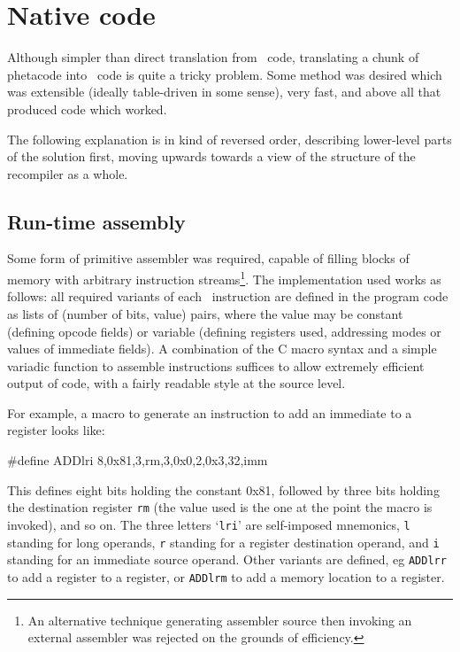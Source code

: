 \section{Native code}

Although simpler than direct translation from \arm\ code, translating a chunk of phetacode into \ia\ code is quite a tricky problem. Some method was desired which was extensible (ideally table-driven in some sense), very fast, and above all that produced code which worked.

The following explanation is in kind of reversed order, describing lower-level parts of the solution first, moving upwards towards a view of the structure of the recompiler as a whole.

\subsection{Run-time assembly}

Some form of primitive assembler was required, capable of filling blocks of memory with arbitrary instruction streams\footnote{An alternative technique generating assembler source then invoking an external assembler was rejected on the grounds of efficiency.}. The implementation used works as follows: all required variants of each \ia\ instruction are defined in the program code as lists of (number of bits, value) pairs, where the value may be constant (defining opcode fields) or variable (defining registers used, addressing modes or values of immediate fields). A combination of the C macro syntax and a simple variadic function to assemble instructions suffices to allow extremely efficient output of code, with a fairly readable style at the source level.

For example, a macro to generate an instruction to add an immediate to a register looks like:

\begin{code}
\#define ADDlri 8,0x81,3,rm,3,0x0,2,0x3,32,imm
\end{code}

This defines eight bits holding the constant 0x81, followed by three bits holding the destination register {\tt rm} (the value used is the one at the point the macro is invoked), and so on. The three letters `{\tt lri}' are self-imposed mnemonics, {\tt l} standing for long operands, {\tt r} standing for a register destination operand, and {\tt i} standing for an immediate source operand. Other variants are defined, eg {\tt ADDlrr} to add a register to a register, or {\tt ADDlrm} to add a memory location to a register.

